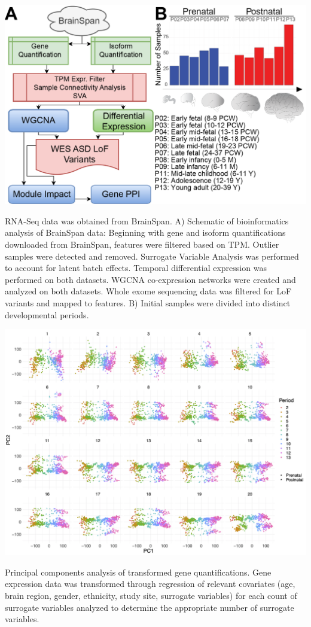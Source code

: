 \documentclass[12pt,chapterheads,final]{ucsd}
\begin{document}
\begin{suppfigure}[h]
  \centering
  \includegraphics[width=1\textwidth]{suppfigure1}
  \caption[RNA-Seq data was obtained from BrainSpan.]
{RNA-Seq data was obtained from BrainSpan. A) Schematic of bioinformatics analysis of BrainSpan data: Beginning with gene and isoform quantifications downloaded from BrainSpan, features were filtered based on TPM. Outlier samples were detected and removed. Surrogate Variable Analysis was performed to account for latent batch effects. Temporal differential expression was performed on both datasets. WGCNA co-expression networks were created and analyzed on both datasets. Whole exome sequencing data was filtered for LoF variants and mapped to features. B) Initial samples were divided into distinct developmental periods.}
\end{suppfigure}

\begin{suppfigure}[h]
  \centering
  \includegraphics[width=1\textwidth]{suppfigure2}
  \caption[Principal components analysis of transformed gene quantifications.]
{Principal components analysis of transformed gene quantifications. Gene expression data was transformed through regression of relevant covariates (age, brain region, gender, ethnicity, study site, surrogate variables) for each count of surrogate variables analyzed to determine the appropriate number of surrogate variables.}
\end{suppfigure}
\end{document}
